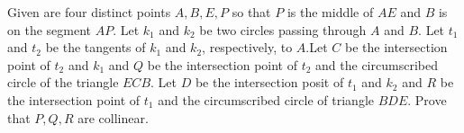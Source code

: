 Given are four distinct points $A, B, E, P$ so that $P$ is the middle of $AE$ and $B$ is on the segment $AP$. Let $k_1$ and $k_2$ be two circles passing through $A$ and $B$. Let $t_1$ and $t_2$ be the tangents of $k_1$ and $k_2$,  respectively, to $A$.Let $C$ be the intersection point of $t_2$ and $k_1$ and $Q$ be the intersection point of $t_2$ and the circumscribed circle of the triangle $ECB$. Let $D$ be the intersection posit of $t_1$ and $k_2$ and $R$ be the intersection point of $t_1$ and the circumscribed circle of triangle $BDE$. Prove that $P, Q, R$ are collinear.
